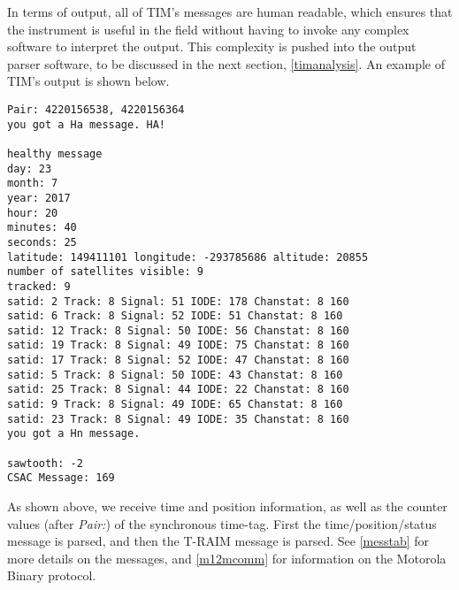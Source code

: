 In terms of output, all of TIM's messages are human readable, which ensures that the instrument is useful in the field without having to invoke any complex software to interpret the output. This complexity is pushed into the output parser software, to be discussed in the next section, \autoref{timanalysis}. An example of TIM's output is shown below. 
\begin{small}
\begin{singlespace}
\begin{verbatim}
Pair: 4220156538, 4220156364
you got a Ha message. HA! 

healthy message
day: 23
month: 7
year: 2017
hour: 20
minutes: 40
seconds: 25
latitude: 149411101 longitude: -293785686 altitude: 20855
number of satellites visible: 9
tracked: 9
satid: 2 Track: 8 Signal: 51 IODE: 178 Chanstat: 8 160
satid: 6 Track: 8 Signal: 52 IODE: 51 Chanstat: 8 160
satid: 12 Track: 8 Signal: 50 IODE: 56 Chanstat: 8 160
satid: 19 Track: 8 Signal: 49 IODE: 75 Chanstat: 8 160
satid: 17 Track: 8 Signal: 52 IODE: 47 Chanstat: 8 160
satid: 5 Track: 8 Signal: 50 IODE: 43 Chanstat: 8 160
satid: 25 Track: 8 Signal: 44 IODE: 22 Chanstat: 8 160
satid: 9 Track: 8 Signal: 49 IODE: 65 Chanstat: 8 160
satid: 23 Track: 8 Signal: 49 IODE: 35 Chanstat: 8 160
you got a Hn message. 

sawtooth: -2
CSAC Message: 169
\end{verbatim}
\end{singlespace}
\end{small}
\normalsize
As shown above, we receive time and position information, as well as the counter values (after \textit{Pair:}) of the synchronous time-tag. First the time/position/status message is parsed, and then the T-RAIM message is parsed. See \autoref{messtab} for more details on the messages, and \autoref{m12mcomm} for information on the Motorola Binary protocol. 



